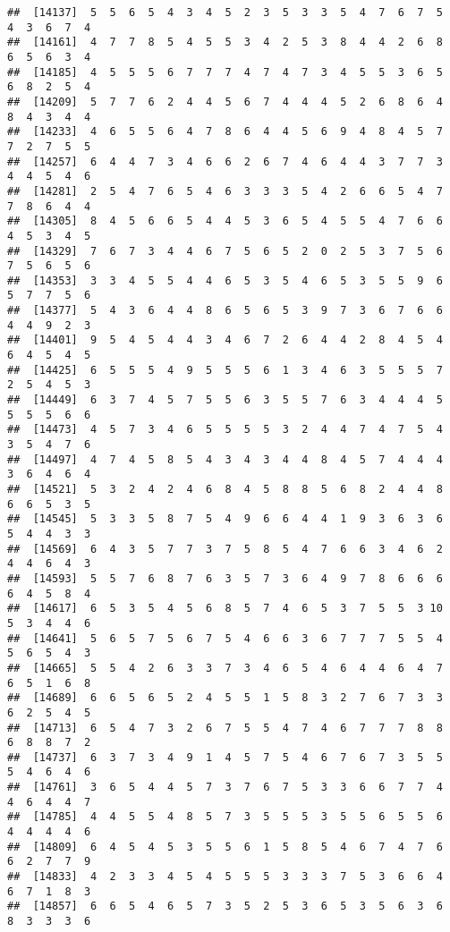 \documentclass[
]{book}
\begin{document}
\begin{verbatim}
##  [14137]  5  5  6  5  4  3  4  5  2  3  5  3  3  5  4  7  6  7  5  4  3  6  7  4
##  [14161]  4  7  7  8  5  4  5  5  3  4  2  5  3  8  4  4  2  6  8  6  5  6  3  4
##  [14185]  4  5  5  5  6  7  7  7  4  7  4  7  3  4  5  5  3  6  5  6  8  2  5  4
##  [14209]  5  7  7  6  2  4  4  5  6  7  4  4  4  5  2  6  8  6  4  8  4  3  4  4
##  [14233]  4  6  5  5  6  4  7  8  6  4  4  5  6  9  4  8  4  5  7  7  2  7  5  5
##  [14257]  6  4  4  7  3  4  6  6  2  6  7  4  6  4  4  3  7  7  3  4  4  5  4  6
##  [14281]  2  5  4  7  6  5  4  6  3  3  3  5  4  2  6  6  5  4  7  7  8  6  4  4
##  [14305]  8  4  5  6  6  5  4  4  5  3  6  5  4  5  5  4  7  6  6  4  5  3  4  5
##  [14329]  7  6  7  3  4  4  6  7  5  6  5  2  0  2  5  3  7  5  6  7  5  6  5  6
##  [14353]  3  3  4  5  5  4  4  6  5  3  5  4  6  5  3  5  5  9  6  5  7  7  5  6
##  [14377]  5  4  3  6  4  4  8  6  5  6  5  3  9  7  3  6  7  6  6  4  4  9  2  3
##  [14401]  9  5  4  5  4  4  3  4  6  7  2  6  4  4  2  8  4  5  4  6  4  5  4  5
##  [14425]  6  5  5  5  4  9  5  5  5  6  1  3  4  6  3  5  5  5  7  2  5  4  5  3
##  [14449]  6  3  7  4  5  7  5  5  6  3  5  5  7  6  3  4  4  4  5  5  5  5  6  6
##  [14473]  4  5  7  3  4  6  5  5  5  5  3  2  4  4  7  4  7  5  4  3  5  4  7  6
##  [14497]  4  7  4  5  8  5  4  3  4  3  4  4  8  4  5  7  4  4  4  3  6  4  6  4
##  [14521]  5  3  2  4  2  4  6  8  4  5  8  8  5  6  8  2  4  4  8  6  6  5  3  5
##  [14545]  5  3  3  5  8  7  5  4  9  6  6  4  4  1  9  3  6  3  6  5  4  4  3  3
##  [14569]  6  4  3  5  7  7  3  7  5  8  5  4  7  6  6  3  4  6  2  4  4  6  4  3
##  [14593]  5  5  7  6  8  7  6  3  5  7  3  6  4  9  7  8  6  6  6  6  4  5  8  4
##  [14617]  6  5  3  5  4  5  6  8  5  7  4  6  5  3  7  5  5  3 10  5  3  4  4  6
##  [14641]  5  6  5  7  5  6  7  5  4  6  6  3  6  7  7  7  5  5  4  5  6  5  4  3
##  [14665]  5  5  4  2  6  3  3  7  3  4  6  5  4  6  4  4  6  4  7  6  5  1  6  8
##  [14689]  6  6  5  6  5  2  4  5  5  1  5  8  3  2  7  6  7  3  3  6  2  5  4  5
##  [14713]  6  5  4  7  3  2  6  7  5  5  4  7  4  6  7  7  7  8  8  6  8  8  7  2
##  [14737]  6  3  7  3  4  9  1  4  5  7  5  4  6  7  6  7  3  5  5  5  4  6  4  6
##  [14761]  3  6  5  4  4  5  7  3  7  6  7  5  3  3  6  6  7  7  4  4  6  4  4  7
##  [14785]  4  4  5  5  4  8  5  7  3  5  5  5  3  5  5  6  5  5  6  4  4  4  4  6
##  [14809]  6  4  5  4  5  3  5  5  6  1  5  8  5  4  6  7  4  7  6  6  2  7  7  9
##  [14833]  4  2  3  3  4  5  4  5  5  5  3  3  3  7  5  3  6  6  4  6  7  1  8  3
##  [14857]  6  6  5  4  6  5  7  3  5  2  5  3  6  5  3  5  6  3  6  8  3  3  3  6

\end{verbatim}
\end{document}
